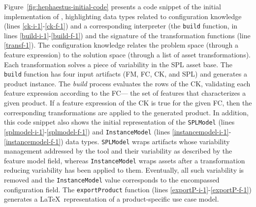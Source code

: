 Figure~\ref{fig:hephaestus-initial-code} presents a code snippet of
the initial implementation of \hp{}, highlighting data types
related to configuration knowledge (lines \ref{ck-i-1}-\ref{ck-f-1})
and a corresponding interpreter (the \texttt{build} function, in lines
\ref{build-i-1}-\ref{build-f-1}) and the signature of the
transformation functions (line \ref{transf-1}). The configuration
knowledge relates the problem space (through a feature expression) to
the solution space (through a list of asset transformations). Each
transformation solves a piece of variability in the SPL asset
base. The \texttt{build} function has four input artifacts (FM, FC,
CK, and SPL) and generates a product instance. The \textit{build}
process evaluates the rows of the CK, validating each feature
expression according to the FC--- the set of features that
characterizes a given product. If a feature expression of the CK is
true for the given FC, then the corresponding transformations are
applied to the generated product.  In addition, this code snippet also
shows the initial representation of the \texttt{SPLModel} (lines
\ref{splmodel-i-1}-\ref{splmodel-f-1}) and \texttt{InstanceModel}
(lines \ref{instancemodel-i-1}-\ref{instancemodel-f-1}) data
types. \texttt{SPLModel} wraps artifacts whose variability management
addressed by the tool and their variability as described by the
feature model field, whereas \texttt{InstanceModel} wraps assets after
a transformation reducing variability has been applied to
them. Eventually, all such variability is removed and the
\texttt{InstanceModel} value corresponds to the encompassed
configuration field. The \texttt{exportProduct} function (lines
\ref{exportP-i-1}-\ref{exportP-f-1}) generates a \LaTeX\
representation of a product-specific use case model.


